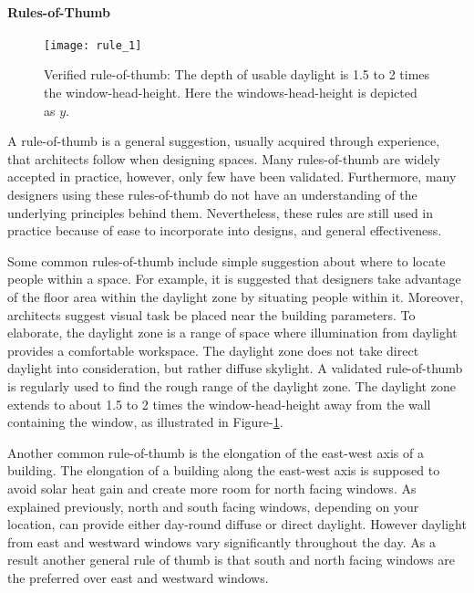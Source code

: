   \paragraph{Rules-of-Thumb}

  \begin{figure}[h]
  \centering
  \texttt{[image: rule\_1]}
  \label{fig:rule_1}
  \caption{Verified rule-of-thumb: The depth of usable daylight is 1.5 to 2 times the window-head-height. Here the windows-head-height is depicted as $y$.}
  \end{figure}

  A rule-of-thumb is a general suggestion, usually acquired through experience, that architects follow when designing spaces. 
  Many rules-of-thumb are widely accepted in practice, however, only few have been validated\cite{reinhart2005simulation}.
  Furthermore, many designers using these rules-of-thumb do not have an understanding of the underlying principles behind them\cite{Galasiu}.
  Nevertheless, these rules are still used in practice because of ease to incorporate into designs, and general effectiveness.

  Some common rules-of-thumb include simple suggestion about where to locate people within a space.
  For example, it is suggested that designers take advantage of the floor area within the daylight zone by situating people within it. \cite{Leslie}
  Moreover, architects suggest visual task be placed near the building parameters\cite{Leslie}.
  To elaborate, the daylight zone is a range of space where illumination from daylight provides a comfortable workspace. 
  The daylight zone does not take direct daylight into consideration, but rather diffuse skylight.
  A validated rule-of-thumb is regularly used to find the rough range of the daylight zone\cite{reinhart2005simulation}. 
  The daylight zone extends to about 1.5 to 2 times the window-head-height away from the wall containing the window, as illustrated in Figure-\ref{fig:rule_1}.

  Another common rule-of-thumb is the elongation of the east-west axis of a building.
  The elongation of a building along the east-west axis is supposed to avoid solar heat gain and create more room for north facing windows\cite{Leslie}.
  As explained previously, north and south facing windows, depending on your location, can provide either day-round diffuse or direct daylight.
  However daylight from east and westward windows vary significantly throughout the day.
  As a result another general rule of thumb is that south and north facing windows are the preferred over east and westward windows\cite{reinhart_lecture}.

